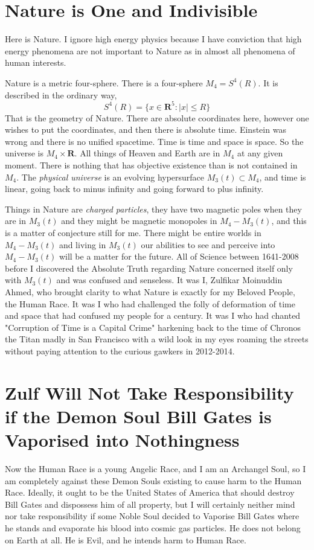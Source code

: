 \documentclass{amsart}
\begin{document}
\section{Nature is One and Indivisible}

Here is Nature.  I ignore high energy physics because I have conviction that high energy phenomena are not important to Nature as in almost all phenomena of human interests.  

Nature is a metric four-sphere.  There is a four-sphere $M_4=S^4(R)$.  It is described in the ordinary way,
\[
S^4(R) = \{ x \in \mathbf{R}^5: |x| \le R \}
\]
That is the geometry of Nature.  There are absolute coordinates here, however one wishes to put the coordinates, and then there is absolute time.  Einstein was wrong and there is no unified spacetime.  Time is time and space is space.  So the universe is $M_4\times\mathbf{R}$.  All things of Heaven and Earth are in $M_4$ at any given moment.  There is nothing that has objective existence than is not contained in $M_4$.  The {\em physical universe} is an evolving hypersurface $M_3(t) \subset M_4$, and time is linear, going back to minus infinity and going forward to plus infinity.

Things in Nature are {\em charged particles}, they have two magnetic poles when they are in $M_3(t)$ and they might be magnetic monopoles in $M_4 - M_3(t)$, and this is a matter of conjecture still for me.  There might be entire worlds in $M_4 - M_3(t)$ and living in $M_3(t)$ our abilities to see and perceive into $M_4 - M_3(t)$ will be a matter for the future.  All of Science between 1641-2008 before I discovered the Absolute Truth regarding Nature concerned itself only with $M_3(t)$ and was confused and senseless.  It was I, Zulfikar Moinuddin Ahmed, who brought clarity to what Nature is exactly for my Beloved People, the Human Race.  It was I who had challenged the folly of deformation of time and space that had confused my people for a century.  It was I who had chanted "Corruption of Time is a Capital Crime" harkening back to the time of Chronos the Titan madly in San Francisco with a wild look in my eyes roaming the streets without paying attention to the curious gawkers in 2012-2014.

\section{Zulf Will Not Take Responsibility if the Demon Soul Bill Gates is Vaporised into Nothingness}

Now the Human Race is a young Angelic Race, and I am an Archangel Soul, so I am completely against these Demon Souls existing to cause harm to the Human Race.  Ideally, it ought to be the United States of America that should destroy Bill Gates and dispossess him of all property, but I will certainly neither mind nor take responsibility if some Noble Soul decided to Vaporise Bill Gates where he stands and evaporate his blood into cosmic gas particles.  He does not belong on Earth at all.  He is Evil, and he intends harm to Human Race.
\end{document}
